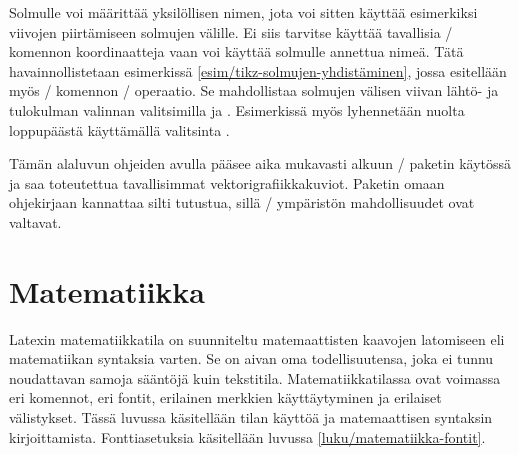 \begin{esimerkki*}

\begin{koodilohko}
\end{koodilohko}

  \begin{tulos}
  \end{tulos}

  \caption{Solmujen nimeäminen ja kytkeminen viivan avulla}
  \label{esim/tikz-solmujen-yhdistäminen}
\end{esimerkki*}

Solmulle voi määrittää yksilöllisen nimen, jota voi sitten käyttää
esimerkiksi viivojen piirtämiseen solmujen välille. Ei siis tarvitse
käyttää tavallisia \-/ komennon koordinaatteja vaan voi
käyttää solmulle annettua nimeä. Tätä havainnollistetaan esimerkissä
\ref{esim/tikz-solmujen-yhdistäminen}, jossa esitellään myös
\-/ komennon \-/ operaatio. Se mahdollistaa
solmujen välisen viivan lähtö- ja tulokulman valinnan valitsimilla
 ja . Esimerkissä myös lyhennetään nuolta
loppupäästä käyttämällä valitsinta .

Tämän alaluvun ohjeiden avulla pääsee aika mukavasti alkuun
\-/ paketin käytössä ja saa toteutettua tavallisimmat
vektorigrafiikkakuviot. Paketin omaan ohjekirjaan kannattaa silti
tutustua, sillä \-/ ympäristön mahdollisuudet
ovat valtavat.

\section{Matematiikka}
\label{luku/matematiikka}

Latexin matematiikkatila on suunniteltu matemaattisten kaavojen
latomiseen eli matematiikan syntaksia varten. Se on aivan oma
todellisuutensa, joka ei tunnu noudattavan samoja sääntöjä kuin
tekstitila. Matematiikkatilassa ovat voimassa eri komennot, eri fontit,
erilainen merkkien käyttäytyminen ja erilaiset välistykset. Tässä
luvussa käsitellään tilan käyttöä ja matemaattisen syntaksin
kirjoittamista. Fonttiasetuksia käsitellään luvussa
\ref{luku/matematiikka-fontit}.

